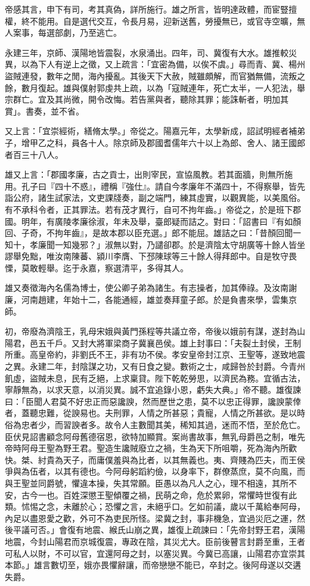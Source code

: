 \begin{pinyinscope}
帝感其言，申下有司，考其真偽，詳所施行。雄之所言，皆明達政體，而宦豎擅權，終不能用。自是選代交互，令長月易，迎新送舊，勞擾無已，或官寺空曠，無人案事，每選部劇，乃至逃亡。

永建三年，京師、漢陽地皆震裂，水泉涌出。四年，司、冀復有大水。雄推較災異，以為下人有逆上之徵，又上疏言：「宜密為備，以俟不虞。」尋而青、冀、楊州盜賊連發，數年之閒，海內擾亂。其後天下大赦，賊雖頗解，而官猶無備，流叛之餘，數月復起。雄與僕射郭虔共上疏，以為「寇賊連年，死亡太半，一人犯法，舉宗群亡。宜及其尚微，開令改悔。若告黨與者，聽除其罪；能誅斬者，明加其賞」。書奏，並不省。

又上言：「宜崇經術，繕脩太學。」帝從之。陽嘉元年，太學新成，詔試明經者補弟子，增甲乙之科，員各十人。除京師及郡國耆儒年六十以上為郎、舍人、諸王國郎者百三十八人。

雄又上言：「郡國孝廉，古之貢士，出則宰民，宣協風教。若其面牆，則無所施用。孔子曰『四十不惑』，禮稱『強仕』。請自今孝廉年不滿四十，不得察舉，皆先詣公府，諸生試家法，文吏課牋奏，副之端門，練其虛實，以觀異能，以美風俗。有不承科令者，正其罪法。若有茂才異行，自可不拘年齒。」帝從之，於是班下郡國。明年，有廣陵孝廉徐淑，年未及舉，臺郎疑而詰之。對曰：「詔書曰『有如顏回、子奇，不拘年齒』，是故本郡以臣充選。」郎不能屈。雄詰之曰：「昔顏回聞一知十，孝廉聞一知幾邪？」淑無以對，乃譴卻郡。於是濟陰太守胡廣等十餘人皆坐謬舉免黜，唯汝南陳蕃、潁川李膺、下邳陳球等三十餘人得拜郎中。自是牧守畏慄，莫敢輕舉。迄于永嘉，察選清平，多得其人。

雄又奏徵海內名儒為博士，使公卿子弟為諸生。有志操者，加其俸祿。及汝南謝廉，河南趙建，年始十二，各能通經，雄並奏拜童子郎。於是負書來學，雲集京師。

初，帝廢為濟陰王，乳母宋娥與黃門孫程等共議立帝，帝後以娥前有謀，遂封為山陽君，邑五千戶。又封大將軍梁商子冀襄邑侯。雄上封事曰：「夫裂土封侯，王制所重。高皇帝約，非劉氏不王，非有功不侯。孝安皇帝封江京、王聖等，遂致地震之異。永建二年，封陰謀之功，又有日食之變。數術之士，咸歸咎於封爵。今青州飢虛，盜賊未息，民有乏絕，上求稟貸。陛下乾乾勞思，以濟民為務。宜循古法，寧靜無為，以求天意，以消災異。誠不宜追錄小恩，虧失大典。」帝不聽。雄復諫曰：「臣聞人君莫不好忠正而惡讒諛，然而歷世之患，莫不以忠正得罪，讒諛蒙倖者，蓋聽忠難，從諛易也。夫刑罪，人情之所甚惡；貴寵，人情之所甚欲。是以時俗為忠者少，而習諛者多。故令人主數聞其美，稀知其過，迷而不悟，至於危亡。臣伏見詔書顧念阿母舊德宿恩，欲特加顯賞。案尚書故事，無乳母爵邑之制，唯先帝時阿母王聖為野王君。聖造生讒賊廢立之禍，生為天下所咀嚼，死為海內所歡快。桀、紂貴為天子，而庸僕羞與為比者，以其無義也。夷、齊賤為匹夫，而王侯爭與為伍者，以其有德也。今阿母躬蹈約儉，以身率下，群僚蒸庶，莫不向風，而與王聖並同爵號，懼違本操，失其常願。臣愚以為凡人之心，理不相遠，其所不安，古今一也。百姓深懲王聖傾覆之禍，民萌之命，危於累卵，常懼時世復有此類。怵惕之念，未離於心；恐懼之言，未絕乎口。乞如前議，歲以千萬給奉阿母，內足以盡恩愛之歡，外可不為吏民所怪。梁冀之封，事非機急，宜過災厄之運，然後平議可否。」會復有地震、緱氏山崩之異，雄復上疏諫曰：「先帝封野王君，漢陽地震，今封山陽君而京城復震，專政在陰，其災尤大。臣前後瞽言封爵至重，王者可私人以財，不可以官，宜還阿母之封，以塞災異。今冀已高讓，山陽君亦宜崇其本節。」雄言數切至，娥亦畏懼辭讓，而帝戀戀不能已，卒封之。後阿母遂以交遘失爵。


\end{pinyinscope}
